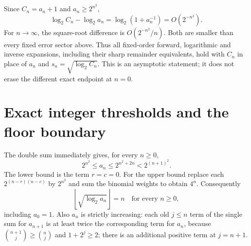 \documentclass[11pt]{article}
\theoremstyle{definition}
\theoremstyle{remark}
\begin{document}
Since $C_n=a_n+1$ and $a_n\geq2^{n^2}$,
\begin{equation}\label{cta:eq:Cchange}
 \log_2C_n-\log_2a_n=\log_2(1+a_n^{-1})=O(2^{-n^2}).
\end{equation}
For $n\to\infty$, the square-root difference is $O(2^{-n^2}/n)$.
Both are smaller than every fixed error sector above. Thus all fixed-order
forward, logarithmic and inverse expansions, including their sharp
remainder equivalents, hold with $C_n$ in place of $a_n$ and
$s_n=\sqrt{\log_2C_n}$. This is an asymptotic statement; it does not erase
the different exact endpoint at $n=0$.

\section{Exact integer thresholds and the floor boundary}\label{cta:sec:threshold}

The double sum immediately gives, for every $n\geq0$,
\begin{equation}\label{cta:eq:brackets}
 2^{n^2}\leq a_n\leq2^{n^2+2n}<2^{(n+1)^2}.
\end{equation}
The lower bound is the term $r=c=0$. For the upper bound replace each
$2^{(n-r)(n-c)}$ by $2^{n^2}$ and sum the binomial weights to obtain $4^n$.
Consequently
\begin{equation}\label{cta:eq:floorpoint}
 \left\lfloor\sqrt{\log_2a_n}\right\rfloor=n
 \quad\text{for every }n\geq0,
\end{equation}
including $a_0=1$. Also $a_n$ is strictly increasing: each old $j\leq n$
term of the single sum for $a_{n+1}$ is at least twice the corresponding
term for $a_n$, because $\binom{n+1}{j}\geq\binom nj$ and $1+2^j\geq2$;
there is an additional positive term at $j=n+1$.
\end{document}
